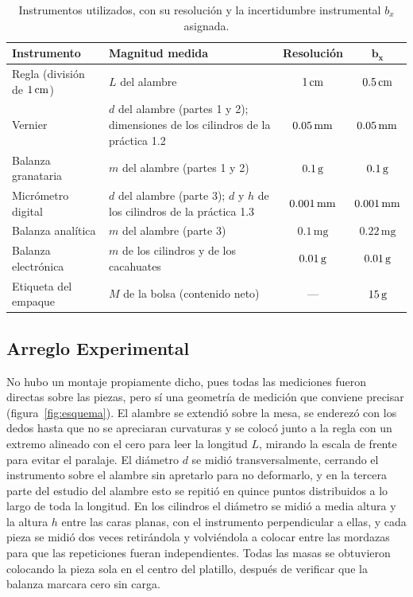 \begin{table}[t]
    \centering
    \small
    \caption{Instrumentos utilizados, con su resolución y la incertidumbre instrumental $b_x$ asignada.}
    \label{tab:instrumentos}
    \begin{tabular}{l p{9.2cm} c c}
        \toprule
        \textbf{Instrumento} & \textbf{Magnitud medida} & \textbf{Resolución} & $\bm{b_x}$ \\
        \midrule
        Regla (división de $1\,\mathrm{cm}$) & $L$ del alambre & $1\,\mathrm{cm}$ & $0.5\,\mathrm{cm}$ \\
        Vernier & $d$ del alambre (partes 1 y 2); dimensiones de los cilindros de la práctica 1.2 & $0.05\,\mathrm{mm}$ & $0.05\,\mathrm{mm}$ \\
        Balanza granataria & $m$ del alambre (partes 1 y 2) & $0.1\,\mathrm{g}$ & $0.1\,\mathrm{g}$ \\
        Micrómetro digital & $d$ del alambre (parte 3); $d$ y $h$ de los cilindros de la práctica 1.3 & $0.001\,\mathrm{mm}$ & $0.001\,\mathrm{mm}$ \\
        Balanza analítica & $m$ del alambre (parte 3) & $0.1\,\mathrm{mg}$ & $0.22\,\mathrm{mg}$ \\
        Balanza electrónica & $m$ de los cilindros y de los cacahuates & $0.01\,\mathrm{g}$ & $0.01\,\mathrm{g}$ \\
        Etiqueta del empaque & $M$ de la bolsa (contenido neto) & --- & $15\,\mathrm{g}$ \\
        \bottomrule
    \end{tabular}
\end{table}

\subsection{Arreglo Experimental}

No hubo un montaje propiamente dicho, pues todas las mediciones fueron directas sobre las piezas, pero sí una geometría de medición que conviene precisar (figura~\ref{fig:esquema}). El alambre se extendió sobre la mesa, se enderezó con los dedos hasta que no se apreciaran curvaturas y se colocó junto a la regla con un extremo alineado con el cero para leer la longitud $L$, mirando la escala de frente para evitar el paralaje. El diámetro $d$ se midió transversalmente, cerrando el instrumento sobre el alambre sin apretarlo para no deformarlo, y en la tercera parte del estudio del alambre esto se repitió en quince puntos distribuidos a lo largo de toda la longitud. En los cilindros el diámetro se midió a media altura y la altura $h$ entre las caras planas, con el instrumento perpendicular a ellas, y cada pieza se midió dos veces retirándola y volviéndola a colocar entre las mordazas para que las repeticiones fueran independientes. Todas las masas se obtuvieron colocando la pieza sola en el centro del platillo, después de verificar que la balanza marcara cero sin carga.

